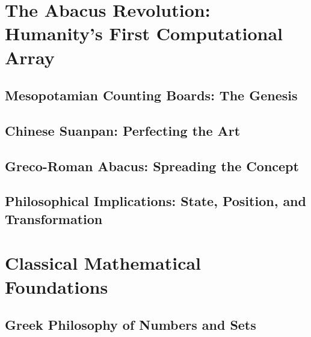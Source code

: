 \documentclass[12pt, oneside, openany]{book}
\begin{document}

\chapter{The Abacus Revolution: Humanity's First Computational Array}

\section{Mesopotamian Counting Boards: The Genesis}

\section{Chinese Suanpan: Perfecting the Art}

\section{Greco-Roman Abacus: Spreading the Concept}

\section{Philosophical Implications: State, Position, and Transformation}


\chapter{Classical Mathematical Foundations}

\section{Greek Philosophy of Numbers and Sets}
\end{document}
